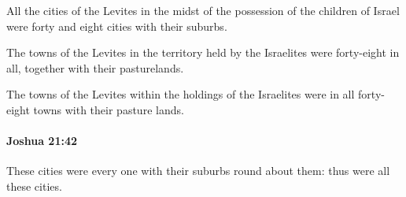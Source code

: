 			\begin{versebox}
					\item[BHS] 
					\item[ASV] All the cities of the Levites in the midst of the possession of the children of Israel were forty and eight cities with their suburbs.
					\item[NIV] The towns of the Levites in the territory held by the Israelites were forty-eight in all, together with their pasturelands.
					\item[NRSV] The towns of the Levites within the holdings of the Israelites were in all forty-eight towns with their pasture lands.
			\end{versebox}

		\paragraph{Joshua 21:42} %
			\label{JOSHUA-21-42}

			These cities were every one with their suburbs round about them: thus were all these cities.

